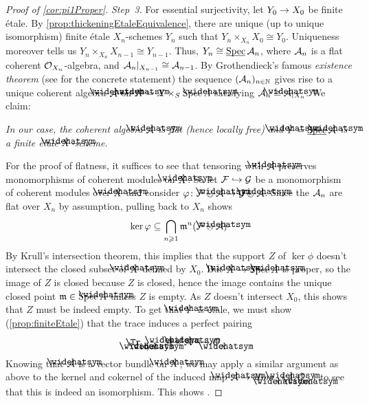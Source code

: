 \begin{proof}[Proof of \cref{cor:pi1Proper}]
	\emph{Step~3.} For essential surjectivity, let $Y_0\morphism X_0$ be finite étale. By \cref{prop:thickeningEtaleEquivalence}, there are unique (up to unique isomorphism) finite étale $X_n$-schemes $Y_n$ such that $Y_n\times_{X_n}X_0\cong Y_0$. Uniqueness moreover tells us $Y_n\times_{X_n}X_{n-1}\cong Y_{n-1}$. Thus, $Y_n\cong \operatorname{\underline{\smash{\mathrm{Spec}}}}\mathcal{A}_n$, where $\mathcal{A}_n$ is a flat coherent $\mathcal{O}_{X_n}$-algebra, and $\mathcal{A}_n|_{X_{n-1}}\cong \mathcal{A}_{n-1}$. By Grothendieck's famous \emph{existence theorem} (see \cite[Théorème~(5.1.4)]{egaIII} for the concrete statement) the sequence $(\mathcal{A}_n)_{n\in\mathbb{N}}$ gives rise to a unique coherent algebra $\roof{\Aa}$ on $\roof{X}=X\times_S\Spec \roof{A}$ satisfying $\Aa_n\cong \roof{\Aa}|_{X_n}$. We claim:
	\begin{alphanumerate}
		\item[\itememph{\boxtimes}] \itshape In our case, the coherent algebra $\roof{\Aa}$ is flat (hence locally free) and $\roof{Y}=\SPEC\roof{\Aa}$ is a finite étale $\roof{X}$-scheme.
	\end{alphanumerate}
	For the proof of flatness, it suffices to see that tensoring with $\roof{\Aa}$ preserves monomorphisms of coherent modules on $\roof{X}$. So let $\Ff\monomorphism \Gg$ be a monomorphism of coherent modules over $\roof{X}$ and consider $\phi\colon \Ff\otimes\roof{\Aa}\morphism \Gg\otimes\roof{\Aa}$. Since the $\mathcal{A}_n$ are flat over $X_n$ by assumption, pulling back to $X_n$ shows
	\begin{equation*}
		\ker\phi\subseteq\bigcap_{n\geq 1}\mm^n(\Ff\otimes\roof{\Aa})
	\end{equation*}
	By Krull's intersection theorem, this implies that the support $Z$ of $\ker\phi$ doesn't intersect the closed subset of $\roof{X}$ defined by $X_0$. But $\roof{X}\morphism \Spec\roof{A}$ is proper, so the image of $Z$ is closed because $Z$ is closed, hence the image contains the unique closed point $\mm\in\Spec \roof{A}$ unless $Z$ is empty. As $Z$ doesn't intersect $X_0$, this shows that $Z$ must be indeed empty. To get that $\roof{Y}$ is étale, we must show (\cref{prop:finiteEtale}) that the trace induces a perfect pairing
	\begin{equation*}
		\Tr_{\roof{\Aa}/\roof{X}}\colon \roof{\Aa}\times \roof{\Aa}\morphism\Oo_{\roof{X}}\,.
	\end{equation*}
	Knowing that $\roof{\Aa}$ is a vector bundle on $\roof{X}$, we may apply a similar argument as above to the kernel and cokernel of the induced map $\roof{\Aa}\morphism\Hhom_{\roof{X}}(\roof{\Aa},\Oo_{\roof{X}})$ to see that this is indeed an isomorphism. This shows \itememph{\boxtimes}.
	

\end{proof}
